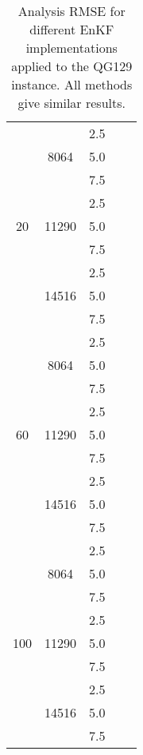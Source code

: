 \documentclass[12pt]{article}
\begin{document}
\begin{table}[H]
\centering
{\footnotesize
\begin{tabular}{|c|c|c|c|c|} \hline
 &  &  &  &  \\ \hline
\multirow{9}{*}{20} &  \multirow{3}{*}{8064}  & 2.5 &  &  \\
& & 5.0 &  &    \\ 
& & 7.5 &  &    \\ 
\cline{2-5}
&  \multirow{3}{*}{11290}  & 2.5 &  &   \\
& & 5.0 &  &    \\ 
& & 7.5 &  &    \\ 
\cline{2-5}
&  \multirow{3}{*}{14516}  & 2.5 &  &   \\
& & 5.0 &  &    \\ 
& & 7.5 &  &    \\ 
\cline{1-5}
\multirow{9}{*}{60} &  \multirow{3}{*}{8064}  & 2.5 &  &  \\
& & 5.0 &  &    \\ 
& & 7.5 &  &    \\ 
\cline{2-5}
&  \multirow{3}{*}{11290}  & 2.5 &  &   \\
& & 5.0 &  &    \\ 
& & 7.5 &  &    \\ 
\cline{2-5}
&  \multirow{3}{*}{14516}  & 2.5 &  &   \\
& & 5.0 &  &    \\ 
& & 7.5 &  &    \\ 
\cline{1-5}
\multirow{9}{*}{100} &  \multirow{3}{*}{8064}  & 2.5 &  &  \\
& & 5.0 &  &    \\ 
& & 7.5 &  &    \\ 
\cline{2-5}
&  \multirow{3}{*}{11290}  & 2.5 &  &   \\
& & 5.0 &  &    \\ 
& & 7.5 &  &    \\ 
\cline{2-5}
&  \multirow{3}{*}{14516}  & 2.5 &  &   \\
& & 5.0 &  &    \\ 
& & 7.5 &  &    \\ 
\hline
\end{tabular}
}
\caption{Analysis RMSE for different EnKF implementations applied to the QG129 instance.
All methods give similar results.}
\label{Tab:QG129-Results-RMSE}
\end{table}
\end{document}
